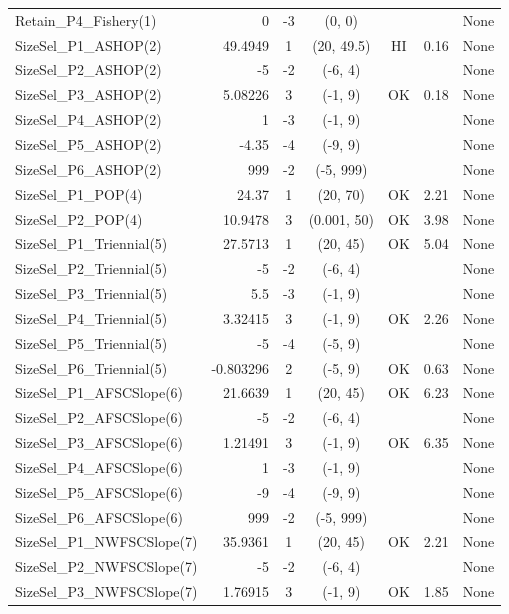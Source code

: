 \documentclass[12pt,]{article}
\begin{document}
\begin{landscape}
\begin{longtable}{lrcccll}
  Retain\_P4\_Fishery(1) & 0 & -3 & (0, 0) &  &  & None \\ 
  SizeSel\_P1\_ASHOP(2) & 49.4949 & 1 & (20, 49.5) & HI & 0.16 & None \\ 
  SizeSel\_P2\_ASHOP(2) & -5 & -2 & (-6, 4) &  &  & None \\ 
  SizeSel\_P3\_ASHOP(2) & 5.08226 & 3 & (-1, 9) & OK & 0.18 & None \\ 
  SizeSel\_P4\_ASHOP(2) & 1 & -3 & (-1, 9) &  &  & None \\ 
  SizeSel\_P5\_ASHOP(2) & -4.35 & -4 & (-9, 9) &  &  & None \\ 
  SizeSel\_P6\_ASHOP(2) & 999 & -2 & (-5, 999) &  &  & None \\ 
  SizeSel\_P1\_POP(4) & 24.37 & 1 & (20, 70) & OK & 2.21 & None \\ 
  SizeSel\_P2\_POP(4) & 10.9478 & 3 & (0.001, 50) & OK & 3.98 & None \\ 
  SizeSel\_P1\_Triennial(5) & 27.5713 & 1 & (20, 45) & OK & 5.04 & None \\ 
  SizeSel\_P2\_Triennial(5) & -5 & -2 & (-6, 4) &  &  & None \\ 
  SizeSel\_P3\_Triennial(5) & 5.5 & -3 & (-1, 9) &  &  & None \\ 
  SizeSel\_P4\_Triennial(5) & 3.32415 & 3 & (-1, 9) & OK & 2.26 & None \\ 
  SizeSel\_P5\_Triennial(5) & -5 & -4 & (-5, 9) &  &  & None \\ 
  SizeSel\_P6\_Triennial(5) & -0.803296 & 2 & (-5, 9) & OK & 0.63 & None \\ 
  SizeSel\_P1\_AFSCSlope(6) & 21.6639 & 1 & (20, 45) & OK & 6.23 & None \\ 
  SizeSel\_P2\_AFSCSlope(6) & -5 & -2 & (-6, 4) &  &  & None \\ 
  SizeSel\_P3\_AFSCSlope(6) & 1.21491 & 3 & (-1, 9) & OK & 6.35 & None \\ 
  SizeSel\_P4\_AFSCSlope(6) & 1 & -3 & (-1, 9) &  &  & None \\ 
  SizeSel\_P5\_AFSCSlope(6) & -9 & -4 & (-9, 9) &  &  & None \\ 
  SizeSel\_P6\_AFSCSlope(6) & 999 & -2 & (-5, 999) &  &  & None \\ 
  SizeSel\_P1\_NWFSCSlope(7) & 35.9361 & 1 & (20, 45) & OK & 2.21 & None \\ 
  SizeSel\_P2\_NWFSCSlope(7) & -5 & -2 & (-6, 4) &  &  & None \\ 
  SizeSel\_P3\_NWFSCSlope(7) & 1.76915 & 3 & (-1, 9) & OK & 1.85 & None \\ 

\end{longtable}
\end{landscape}
\end{document}
